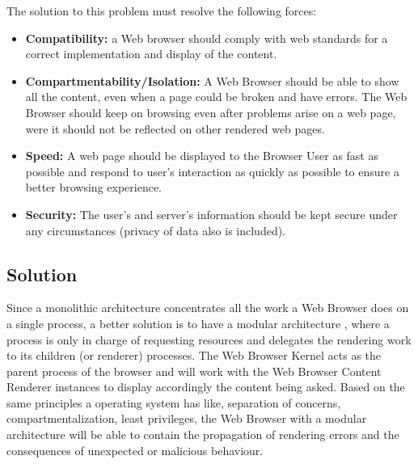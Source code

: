 \documentclass[prodmode,hillsideplop]{acmlarge}
\begin{document}
The solution to this problem must resolve the following forces:

\begin{itemize}
	\item \textbf{Compatibility:} a Web browser should comply with web standards for a correct implementation and display of the content.
    \item \textbf{Compartmentability/Isolation:} A Web Browser should be able to show all the content, even when a page could be broken and have errors. The Web Browser should keep on browsing even after problems arise on a web page, were it should not be reflected on other rendered web pages.
    \item \textbf{Speed:} A web page should be displayed to the Browser User as fast as possible and respond to user's interaction as quickly as possible to ensure a better browsing experience.    
    \item \textbf{Security:} The user's and server’s information should be kept secure under any circumstances (privacy of data also is included).
    
\end{itemize}

\subsection{Solution}
Since a monolithic architecture concentrates all the work a Web Browser does on a single process, a better solution is to have a modular architecture \cite{Vrbanec2013,Wu2014,barth2008security,reis2009browser}, where a process is only in charge of requesting resources and delegates the rendering work to its children (or renderer) processes. The Web Browser Kernel acts as the parent process of the browser and will work with the Web Browser Content Renderer \cite{silva2015} instances to display accordingly the content being asked. Based on the same principles a operating system has like, separation of concerns, compartmentalization, least privileges, the Web Browser with a modular architecture will be able to contain the propagation of rendering errors and the consequences of unexpected or malicious behaviour.
\end{document}
